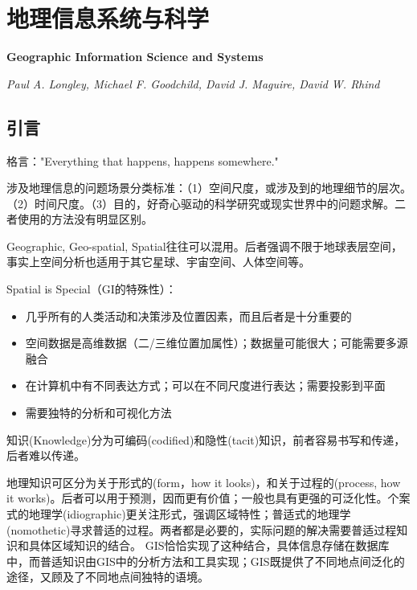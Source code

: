
\chapter{地理信息系统与科学}
\Large\textbf{Geographic Information Science and Systems}
\par \emph{Paul A. Longley, Michael F. Goodchild, David J. Maguire, David W. Rhind} \normalsize

\section{引言}

\par 格言："Everything that happens, happens somewhere."

\par 涉及地理信息的问题场景分类标准：（1）空间尺度，或涉及到的地理细节的层次。（2）时间尺度。（3）目的，好奇心驱动的科学研究或现实世界中的问题求解。二者使用的方法没有明显区别。

\par Geographic, Geo-spatial, Spatial往往可以混用。后者强调不限于地球表层空间，事实上空间分析也适用于其它星球、宇宙空间、人体空间等。

\par Spatial is Special（GI的特殊性）：
\begin{itemize}
    \item 几乎所有的人类活动和决策涉及位置因素，而且后者是十分重要的
    \item 空间数据是高维数据（二/三维位置加属性）；数据量可能很大；可能需要多源融合
    \item 在计算机中有不同表达方式；可以在不同尺度进行表达；需要投影到平面
    \item 需要独特的分析和可视化方法
\end{itemize}

\par 知识(Knowledge)分为可编码(codified)和隐性(tacit)知识，前者容易书写和传递，后者难以传递。

\par 地理知识可区分为关于形式的(form，how it looks)，和关于过程的(process, how it works)。后者可以用于预测，因而更有价值；一般也具有更强的可泛化性。个案式的地理学(idiographic)更关注形式，强调区域特性；普适式的地理学(nomothetic)寻求普适的过程。两者都是必要的，实际问题的解决需要普适过程知识和具体区域知识的结合。 GIS恰恰实现了这种结合，具体信息存储在数据库中，而普适知识由GIS中的分析方法和工具实现；GIS既提供了不同地点间泛化的途径，又顾及了不同地点间独特的语境。

